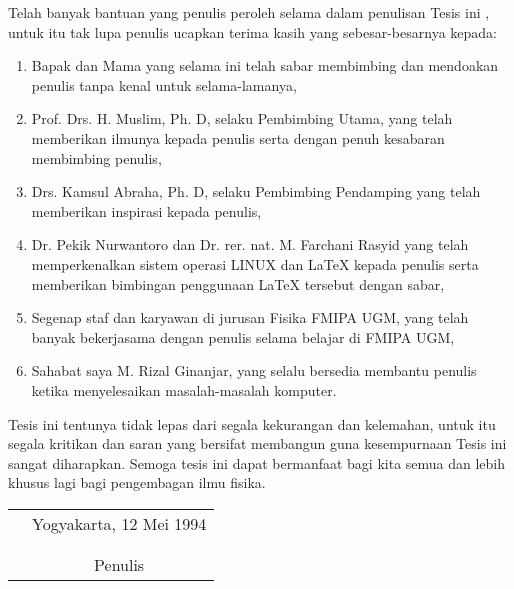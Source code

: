 \documentclass[tesis]{ugmtesis}
\begin{document}
Telah banyak bantuan yang penulis peroleh selama dalam penulisan Tesis ini
, untuk itu tak lupa penulis ucapkan terima kasih yang sebesar-besarnya
kepada:
\begin{enumerate}
\item{Bapak dan Mama yang selama ini telah sabar membimbing dan mendoakan
penulis tanpa kenal untuk selama-lamanya,}
\item{Prof. Drs. H. Muslim, Ph. D, selaku Pembimbing Utama, yang telah
memberikan ilmunya kepada penulis serta dengan penuh kesabaran membimbing penulis,}
\item{Drs. Kamsul Abraha, Ph. D, selaku Pembimbing Pendamping yang telah
memberikan inspirasi kepada penulis,} 
\item{Dr. Pekik Nurwantoro dan Dr. rer. nat. M. Farchani Rasyid
yang telah memperkenalkan sistem operasi LINUX dan \LaTeX{} kepada penulis serta
memberikan bimbingan penggunaan \LaTeX{} tersebut dengan sabar,} 
\item{Segenap staf dan karyawan di jurusan Fisika FMIPA UGM, yang telah
banyak bekerjasama dengan penulis selama belajar di FMIPA UGM,} 
\item{Sahabat saya M. Rizal Ginanjar, yang selalu bersedia membantu penulis ketika
menyelesaikan masalah-masalah komputer.} 
\end{enumerate}

Tesis ini tentunya tidak lepas dari segala kekurangan dan kelemahan, untuk itu
segala kritikan dan saran yang bersifat membangun guna kesempurnaan Tesis ini
sangat diharapkan. Semoga tesis ini dapat bermanfaat bagi kita semua dan lebih
khusus lagi bagi pengembagan ilmu fisika.

\begin{tabular}{p{7.5cm}c}
&Yogyakarta, 12 Mei 1994\\
&\\
&\\
&Penulis
\end{tabular}

\tableofcontents
\listoftables
\listoffigures
\end{document}
